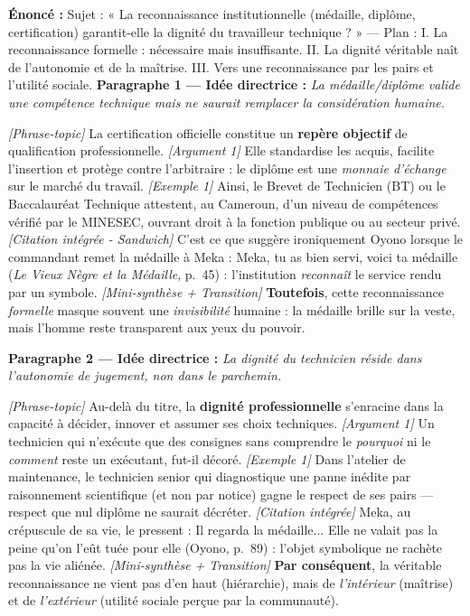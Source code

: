 \documentclass[11pt]{article}
\begin{document}
\begin{exoresolu}
\textbf{Énoncé :} Sujet : « La reconnaissance institutionnelle (médaille, diplôme, certification) garantit-elle la dignité du travailleur technique ? » — Plan : I. La reconnaissance formelle : nécessaire mais insuffisante. II. La dignité véritable naît de l'autonomie et de la maîtrise. III. Vers une reconnaissance par les pairs et l'utilité sociale.
\tcblower
\textbf{Paragraphe 1 — Idée directrice :} \emph{La médaille/diplôme valide une compétence technique mais ne saurait remplacer la considération humaine.}

\textit{[Phrase-topic]} La certification officielle constitue un \textbf{repère objectif} de qualification professionnelle. \textit{[Argument 1]} Elle standardise les acquis, facilite l'insertion et protège contre l'arbitraire : le diplôme est une \emph{monnaie d'échange} sur le marché du travail. \textit{[Exemple 1]} Ainsi, le Brevet de Technicien (BT) ou le Baccalauréat Technique attestent, au Cameroun, d'un niveau de compétences vérifié par le MINESEC, ouvrant droit à la fonction publique ou au secteur privé. \textit{[Citation intégrée - Sandwich]} C'est ce que suggère ironiquement Oyono lorsque le commandant remet la médaille à Meka : \og Meka, tu as bien servi, voici ta médaille \fg{} (\emph{Le Vieux Nègre et la Médaille}, p.~45) : l'institution \emph{reconnaît} le service rendu par un symbole. \textit{[Mini-synthèse + Transition]} \textbf{Toutefois}, cette reconnaissance \emph{formelle} masque souvent une \emph{invisibilité} humaine : la médaille brille sur la veste, mais l'homme reste transparent aux yeux du pouvoir.

\textbf{Paragraphe 2 — Idée directrice :} \emph{La dignité du technicien réside dans l'autonomie de jugement, non dans le parchemin.}

\textit{[Phrase-topic]} Au-delà du titre, la \textbf{dignité professionnelle} s'enracine dans la capacité à décider, innover et assumer ses choix techniques. \textit{[Argument 1]} Un technicien qui n'exécute que des consignes sans comprendre le \emph{pourquoi} ni le \emph{comment} reste un exécutant, fut-il décoré. \textit{[Exemple 1]} Dans l'atelier de maintenance, le technicien senior qui diagnostique une panne inédite par raisonnement scientifique (et non par notice) gagne le respect de ses pairs — respect que nul diplôme ne saurait décréter. \textit{[Citation intégrée]} Meka, au crépuscule de sa vie, le pressent : \og Il regarda la médaille... Elle ne valait pas la peine qu'on l'eût tuée pour elle \fg{} (Oyono, p.~89) : l'objet symbolique ne rachète pas la vie aliénée. \textit{[Mini-synthèse + Transition]} \textbf{Par conséquent}, la véritable reconnaissance ne vient pas d'en haut (hiérarchie), mais de \emph{l'intérieur} (maîtrise) et de \emph{l'extérieur} (utilité sociale perçue par la communauté).
\end{exoresolu}
\end{document}

